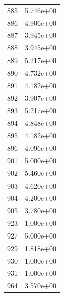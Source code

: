 \documentclass[12pt]{article}
\begin{document}
\begin{longtable}{@{}cc@{}}
885 & 5.746e+00 \\
886 & 4.906e+00 \\
887 & 3.945e+00 \\
888 & 3.945e+00 \\
889 & 5.217e+00 \\
890 & 4.732e+00 \\
891 & 4.182e+00 \\
892 & 3.907e+00 \\
893 & 5.217e+00 \\
894 & 4.848e+00 \\
895 & 4.182e+00 \\
896 & 4.096e+00 \\
901 & 5.000e+00 \\
902 & 5.460e+00 \\
903 & 4.620e+00 \\
904 & 4.200e+00 \\
905 & 3.780e+00 \\
923 & 1.000e+00 \\
927 & 5.000e+00 \\
929 & 1.818e+00 \\
930 & 1.000e+00 \\
931 & 1.000e+00 \\
964 & 3.570e+00 \\

\bottomrule
\end{longtable}
\end{document}
